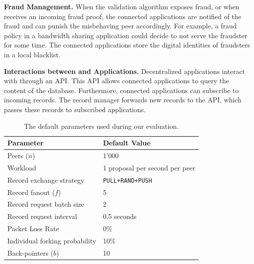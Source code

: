 \textbf{Fraud Management.}
When the validation algorithm exposes fraud, or when \TrustChain{} receives an incoming fraud proof, the connected applications are notified of the fraud and can punish the misbehaving peer accordingly.
For example, a fraud policy in a bandwidth sharing application could decide to not serve the fraudster for some time.
The connected applications store the digital identities of fraudsters in a local blacklist.

\textbf{Interactions between \TrustChain{} and Applications.}
Decentralized applications interact with \TrustChain{} through an API.
This API allows connected applications to query the content of the database.
Furthermore, connected applications can subscribe to incoming records.
The record manager forwards new records to the API, which passes these records to subscribed applications.

\begin{table}[]
	\begin{center}
		\begin{tabular}{l l}
			\hline
			\textbf{Parameter} & \textbf{Default Value}  \\ \hline
			Peers ($ n $) & 1'000 \\
			Workload & 1 proposal per second per peer \\
			Record exchange strategy & \texttt{PULL+RAND+PUSH} \\
			Record fanout ($ f $) & 5 \\
			Record request batch size & 2 \\
			Record request interval & 0.5 seconds \\
			Packet Loss Rate & 0\% \\
			Individual forking probability & 10\% \\
			Back-pointers ($ b $) & 10 \\ \hline
		\end{tabular}
		\caption{The default parameters used during our evaluation.}
		\label{tab:experiment_parameters}
	\end{center}
\end{table}


